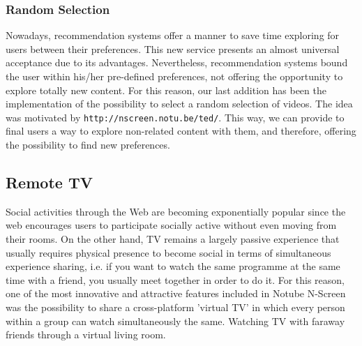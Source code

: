 \documentclass{acm_proc_article-sp}
\begin{document}
\subsubsection{Random Selection}
Nowadays, recommendation systems offer a manner to save time  exploring for users between their preferences.
This new service presents an almost universal acceptance due to its advantages\cite{bobadilla2013recommender}. Nevertheless, recommendation systems bound the user within his/her pre-defined preferences, not offering the opportunity to explore totally new content. For this reason, our last addition has been the implementation of the possibility to select a random selection of videos. The idea was motivated by \texttt{http://nscreen.notu.be/ted/}. This way, we can provide to final users a way to explore non-related content with them, and therefore, offering the possibility to find new preferences. 

\subsection{Remote TV}

Social activities through the Web are becoming exponentially popular since the web encourages users to  participate socially active without even moving from their rooms\cite{schopman2010notube}. On the other hand, TV remains a largely passive experience that usually requires physical presence to become social in terms of simultaneous experience sharing, i.e. if you want to watch the same programme at the same time with a friend, you usually meet together in order to do it. For this reason, one of the most innovative and attractive features included in Notube N-Screen was the possibility to share a cross-platform 'virtual TV' in which every person within a group can watch simultaneously the same. Watching TV with faraway friends through a virtual living room.
\end{document}
